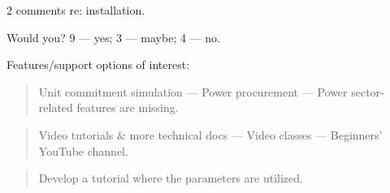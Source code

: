 \documentclass[12pt,aspectratio=169]{beamer}
\begin{document}
\begin{frame}[allowframebreaks]
2 comments re: installation.

\framebreak


\medskip
Would you? 9 — yes; 3 — maybe; 4 — no.

\medskip
Features/support options of interest:

\begin{quote}
  Unit commitment simulation — Power procurement — Power sector-related features are missing.
\end{quote}

\begin{quote}
  Video tutorials \& more technical docs — Video classes — Beginners' YouTube channel.
\end{quote}

\begin{quote}
  Develop a tutorial where  the parameters are utilized.
\end{quote}

\end{frame}
\end{document}
